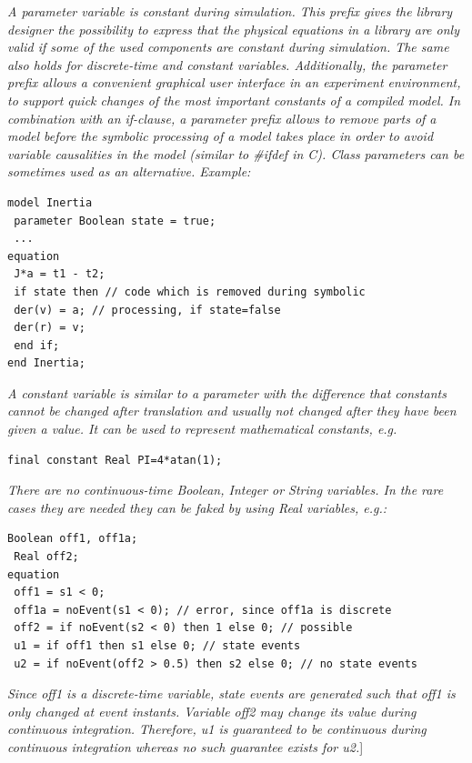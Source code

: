 \documentclass[10pt,a4paper]{report}
\def\Mcommentend#1{\emph{#1}{]}}
\def\Mcommentmid#1{\emph{#1}}
\begin{document}
\Mcommentmid{A parameter variable is constant during simulation. This prefix
gives the library designer the possibility to express that the physical
equations in a library are only valid if some of the used components are
constant during simulation. The same also holds for discrete-time and
constant variables. Additionally, the parameter prefix allows a
convenient graphical user interface in an experiment environment, to
support quick changes of the most important constants of a compiled
model. In combination with an if-clause, a parameter prefix allows to
remove parts of a model before the symbolic processing of a model takes
place in order to avoid variable causalities in the model (similar to
\#ifdef in C). Class parameters can be sometimes used as an alternative.
Example: }
\begin{lstlisting}[language=modelica]
model Inertia
 parameter Boolean state = true;
 ...
equation
 J*a = t1 - t2;
 if state then // code which is removed during symbolic
 der(v) = a; // processing, if state=false
 der(r) = v;
 end if;
end Inertia;
\end{lstlisting}

\Mcommentmid{A constant variable is similar to a parameter with the difference
that constants cannot be changed after translation and usually not
changed after they have been given a value. It can be used to represent
mathematical constants, e.g. }
\begin{lstlisting}[language=modelica]
final constant Real PI=4*atan(1);
\end{lstlisting}
\Mcommentmid{There are no continuous-time \emph{Boolean}, \emph{Integer} or \emph{String}
variables. In the rare cases they are needed they can be
faked by using \emph{Real} variables, e.g.:}
\begin{lstlisting}[language=modelica]
 Boolean off1, off1a;
 Real off2;
equation
 off1 = s1 < 0;
 off1a = noEvent(s1 < 0); // error, since off1a is discrete
 off2 = if noEvent(s2 < 0) then 1 else 0; // possible
 u1 = if off1 then s1 else 0; // state events
 u2 = if noEvent(off2 > 0.5) then s2 else 0; // no state events
\end{lstlisting}

\Mcommentend{Since \emph{off1} is a discrete-time variable, state events are
generated such that \emph{off1} is only changed at event instants.
Variable \emph{off2} may change its value during continuous integration.
Therefore, \emph{u1} is guaranteed to be continuous during continuous
integration whereas no such guarantee exists for \emph{u2}.}
\end{document}
